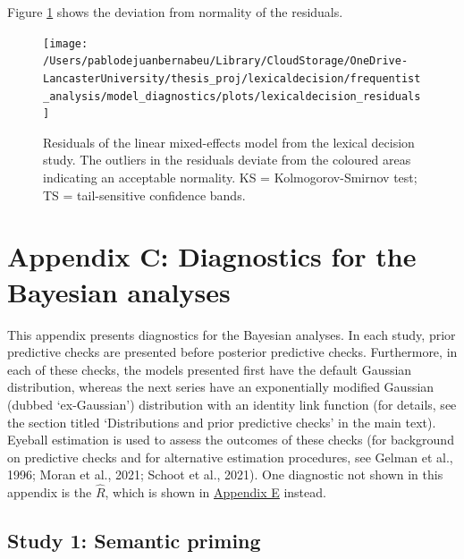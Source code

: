 \documentclass[
  12pt,
  man,floatsintext]{apa7}
\begin{document}
Figure \ref{fig:lexicaldecision-residuals} shows the deviation from normality of the residuals.

\begin{figure}

{\centering \texttt{[image: /Users/pablodejuanbernabeu/Library/CloudStorage/OneDrive-LancasterUniversity/thesis\_proj/lexicaldecision/frequentist\_analysis/model\_diagnostics/plots/lexicaldecision\_residuals]} 

}

\caption{Residuals of the linear mixed-effects model from the lexical decision study. The outliers in the residuals deviate from the coloured areas indicating an acceptable normality. \linebreak KS = Kolmogorov-Smirnov test; TS = tail-sensitive confidence bands.}\label{fig:lexicaldecision-residuals}
\end{figure}

\clearpage

\renewcommand{\thefigure}{C\arabic{figure}} \setcounter{figure}{0}
\renewcommand{\thetable}{C\arabic{table}} \setcounter{table}{0}

\hypertarget{appendix-C-Bayesian-analysis-diagnostics}{%
\section{Appendix C: Diagnostics for the Bayesian analyses}\label{appendix-C-Bayesian-analysis-diagnostics}}

This appendix presents diagnostics for the Bayesian analyses. In each study, prior predictive checks are presented before posterior predictive checks. Furthermore, in each of these checks, the models presented first have the default Gaussian distribution, whereas the next series have an exponentially modified Gaussian (dubbed `ex-Gaussian') distribution with an identity link function (for details, see the section titled `Distributions and prior predictive checks' in the main text). Eyeball estimation is used to assess the outcomes of these checks (for background on predictive checks and for alternative estimation procedures, see Gelman et al., 1996; Moran et al., 2021; Schoot et al., 2021). One diagnostic not shown in this appendix is the \(\widehat R\), which is shown in \protect\hyperlink{appendix-E-Bayesian-analysis-results}{\underline{Appendix E}} instead.

\hypertarget{study1-bayesian-diagnostics}{%
\subsection{Study 1: Semantic priming}\label{study1-bayesian-diagnostics}}
\end{document}

